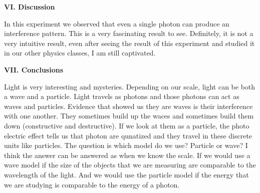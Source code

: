 \documentclass[fleqn]{article}
\begin{document}
  \pagebreak

  
  \vspace{20px}


  \textbf{VI. Discussion}

  \vspace{10px}

  In this experiment we observed that even a single photon can produce an interference pattern. This is 
  a very fascinating result to see. Definitely, it is not a very intuitive result, even after seeing the result
  of this experiment and studied it in our other physics classes, I am still captivated.  
  
  \vspace{20px}


  \textbf{VII. Conclusions}

  \vspace{10px}

  Light is very interesting and mysteries. Depending on our scale, light can be both a wave and a
  particle. Light travels as photons and those photons can act as waves and particles. Evidence that
  showed us they are waves is their interference with one another. They sometimes build up the waces
  and sometimes build them down (constructive and destructive). If we look at them as a particle, the
  photo electric effect tells us that photon are qunatized and they travel in these discrete units like 
  particles. The question is which model do we use? Particle or wave? I think the answer can be answered
  as when we know the scale. If we would use a wave model if the size of the objects that we are measuring
  are comparable to the wavelength of the light. And we would use the particle model if the energy that we are
  studying is comparable to the energy of a photon.   
  
  
  \vspace{20px}


  \printbibliography
\end{document}
